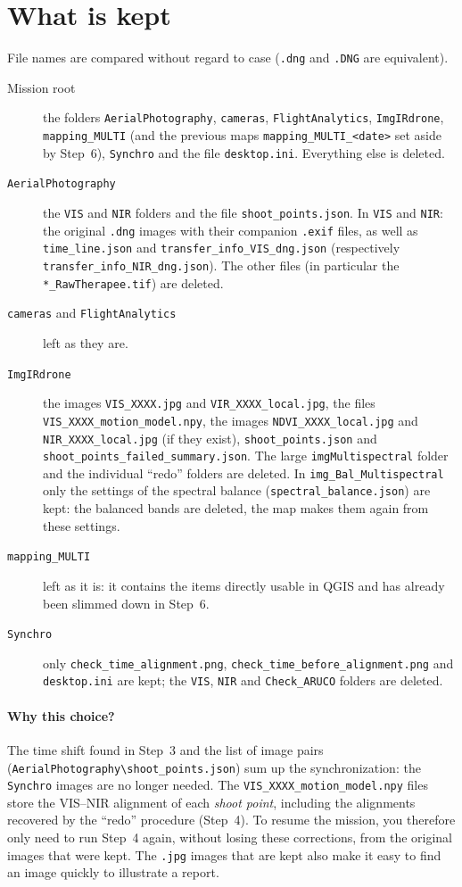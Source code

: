 \documentclass[a4paper,11pt]{report}
\begin{document}
\section{What is kept}\label{btn:step7_rules}
File names are compared without regard to case (\texttt{.dng} and \texttt{.DNG} are equivalent).
\begin{description}
  \item[Mission root] the folders \texttt{AerialPhotography}, \texttt{cameras}, \texttt{FlightAnalytics}, \texttt{ImgIRdrone}, \texttt{mapping\_MULTI} (and the previous maps \texttt{mapping\_MULTI\_<date>} set aside by Step~6), \texttt{Synchro}
        and the file \texttt{desktop.ini}. Everything else is deleted.
  \item[\texttt{AerialPhotography}] the \texttt{VIS} and \texttt{NIR} folders and the file \texttt{shoot\_points.json}. In \texttt{VIS} and \texttt{NIR}: the original
        \texttt{.dng} images with their companion \texttt{.exif} files, as well as \texttt{time\_line.json} and \texttt{transfer\_info\_VIS\_dng.json} (respectively \texttt{transfer\_info\_NIR\_dng.json}).
        The other files (in particular the \texttt{*\_RawTherapee.tif}) are deleted.
  \item[\texttt{cameras} and \texttt{FlightAnalytics}] left as they are.
  \item[\texttt{ImgIRdrone}] the images \texttt{VIS\_XXXX.jpg} and \texttt{VIR\_XXXX\_local.jpg}, the files \texttt{VIS\_XXXX\_motion\_model.npy}, the images
        \texttt{NDVI\_XXXX\_local.jpg} and \texttt{NIR\_XXXX\_local.jpg} (if they exist), \texttt{shoot\_points.json} and \texttt{shoot\_points\_failed\_summary.json}.
        The large \texttt{imgMultispectral} folder and the individual ``redo'' folders are deleted. In \texttt{img\_Bal\_Multispectral} only the settings of the spectral balance (\texttt{spectral\_balance.json}) are kept: the balanced bands are deleted, the map makes them again from these settings.
  \item[\texttt{mapping\_MULTI}] left as it is: it contains the items directly usable in QGIS and has already been slimmed down in Step~6.
  \item[\texttt{Synchro}] only \texttt{check\_time\_alignment.png}, \texttt{check\_time\_before\_alignment.png} and \texttt{desktop.ini} are kept; the \texttt{VIS}, \texttt{NIR} and \texttt{Check\_ARUCO} folders are deleted.
\end{description}

\paragraph{Why this choice?} The time shift found in Step~3 and the list of image pairs (\texttt{AerialPhotography\textbackslash shoot\_points.json}) sum up the synchronization:
the \texttt{Synchro} images are no longer needed. The \texttt{VIS\_XXXX\_motion\_model.npy} files store the VIS--NIR alignment of each \emph{shoot point}, including the alignments
recovered by the ``redo'' procedure (Step~4). To resume the mission, you therefore only need to run Step~4 again, without losing these corrections, from the original images that were kept.
The \texttt{.jpg} images that are kept also make it easy to find an image quickly to illustrate a report.
\end{document}

